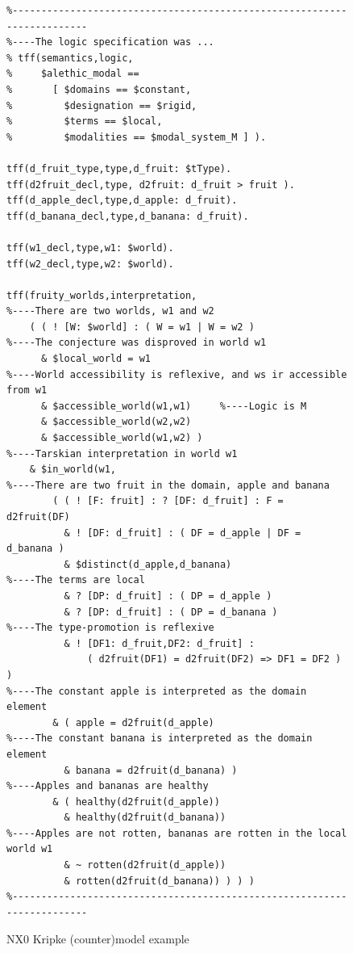 \documentclass{ceurart}
\begin{document}
\begin{figure}[h!]
\small
{}
\begin{verbatim}
%------------------------------------------------------------------------
%----The logic specification was ...
% tff(semantics,logic,
%     $alethic_modal ==
%       [ $domains == $constant,
%         $designation == $rigid,
%         $terms == $local,
%         $modalities == $modal_system_M ] ).

tff(d_fruit_type,type,d_fruit: $tType).
tff(d2fruit_decl,type, d2fruit: d_fruit > fruit ).
tff(d_apple_decl,type,d_apple: d_fruit).
tff(d_banana_decl,type,d_banana: d_fruit).

tff(w1_decl,type,w1: $world).
tff(w2_decl,type,w2: $world).

tff(fruity_worlds,interpretation,
%----There are two worlds, w1 and w2
    ( ( ! [W: $world] : ( W = w1 | W = w2 )
%----The conjecture was disproved in world w1
      & $local_world = w1
%----World accessibility is reflexive, and ws ir accessible from w1
      & $accessible_world(w1,w1)     %----Logic is M
      & $accessible_world(w2,w2)
      & $accessible_world(w1,w2) )
%----Tarskian interpretation in world w1
    & $in_world(w1,
%----There are two fruit in the domain, apple and banana
        ( ( ! [F: fruit] : ? [DF: d_fruit] : F = d2fruit(DF)
          & ! [DF: d_fruit] : ( DF = d_apple | DF = d_banana )
          & $distinct(d_apple,d_banana)
%----The terms are local
          & ? [DP: d_fruit] : ( DP = d_apple )
          & ? [DP: d_fruit] : ( DP = d_banana )
%----The type-promotion is reflexive
          & ! [DF1: d_fruit,DF2: d_fruit] :
              ( d2fruit(DF1) = d2fruit(DF2) => DF1 = DF2 ) )
%----The constant apple is interpreted as the domain element
        & ( apple = d2fruit(d_apple)
%----The constant banana is interpreted as the domain element
          & banana = d2fruit(d_banana) )
%----Apples and bananas are healthy
        & ( healthy(d2fruit(d_apple))
          & healthy(d2fruit(d_banana))
%----Apples are not rotten, bananas are rotten in the local world w1
          & ~ rotten(d2fruit(d_apple))
          & rotten(d2fruit(d_banana)) ) ) )
%------------------------------------------------------------------------
\end{verbatim}
\caption{NX0 Kripke (counter)model example}
\label{NX0Kripke}
\end{figure}
\end{document}
